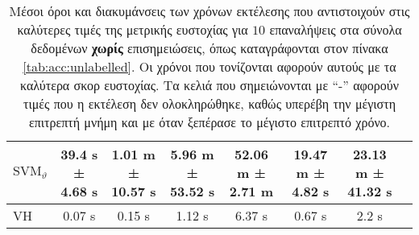 \begin{table}[]
\begin{adjustbox}{angle=90}
{{\begin{tabular}{|l|c|c|c|c|c|c|c|}
$\text{SVM}_{\vartheta}$ &   39.4 s ± 4.68 s &  1.01 m ± 10.57 s &  5.96 m ± 53.52 s &   52.06 m ± 2.71 m &   19.47 m ± 4.82 s &  23.13 m ± 41.32 s \\\hline
VH              &            0.07 s &            0.15 s &            1.12 s &             6.37 s &             0.67 s &              2.2 s \\\hline
\end{tabular}
}
}
\end{adjustbox}
\caption[Μέσοι όροι και διακυμάνσεις των χρόνων εκτέλεσης που αντιστοιχούν στις καλύτερες τιμές της μετρικής ευστοχίας για $10$ επαναλήψεις  στα σύνολα δεδομένων χωρίς επισημειώσεις.]{\small Μέσοι όροι και διακυμάνσεις των χρόνων εκτέλεσης που αντιστοιχούν στις καλύτερες τιμές της μετρικής ευστοχίας για $10$ επαναλήψεις  στα σύνολα δεδομένων \textbf{χωρίς} επισημειώσεις, όπως καταγράφονται στον πίνακα \ref{tab:acc:unlabelled}. Οι χρόνοι που τονίζονται αφορούν αυτούς με τα καλύτερα σκορ ευστοχίας. Τα κελιά που σημειώνονται με ``-'' αφορούν τιμές που η εκτέλεση δεν ολοκληρώθηκε, καθώς υπερέβη την μέγιστη επιτρεπτή μνήμη και με  όταν ξεπέρασε το μέγιστο επιτρεπτό χρόνο.}
\label{tab:time:unlabelled}
\end{table}

